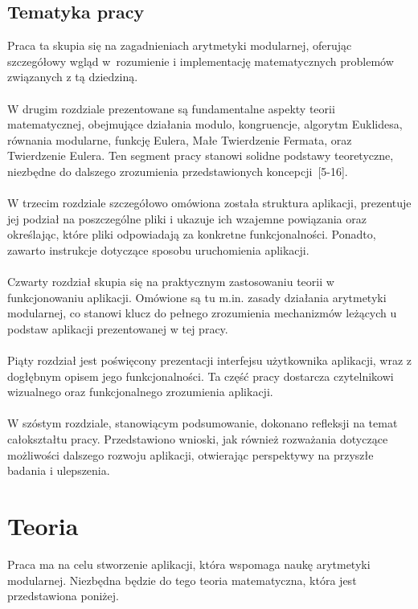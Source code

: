 \documentclass{SGGW-thesis}
\begin{document}
	\section{Tematyka pracy}
	Praca ta skupia się na zagadnieniach arytmetyki modularnej, oferując szczegółowy wgląd w~rozumienie i implementację matematycznych problemów związanych z tą dziedziną.
	\\
	\\
	W drugim rozdziale prezentowane są fundamentalne aspekty teorii matematycznej, obejmujące działania modulo, kongruencje, algorytm Euklidesa, równania modularne, funkcję Eulera, Małe Twierdzenie Fermata, oraz Twierdzenie Eulera. Ten segment pracy stanowi solidne podstawy teoretyczne, niezbędne do dalszego zrozumienia przedstawionych koncepcji~[5-16].
	\\
	\\
	W trzecim rozdziale szczegółowo omówiona została struktura aplikacji, prezentuje jej podział na poszczególne pliki i ukazuje ich wzajemne powiązania oraz określając, które pliki odpowiadają za konkretne funkcjonalności. Ponadto, zawarto instrukcje dotyczące sposobu uruchomienia aplikacji.
	\\
	\\
	Czwarty rozdział skupia się na praktycznym zastosowaniu teorii w funkcjonowaniu aplikacji. Omówione są tu m.in. zasady działania arytmetyki modularnej, co stanowi klucz do pełnego zrozumienia mechanizmów leżących u podstaw aplikacji prezentowanej w tej pracy.
	\\
	\\
	Piąty rozdział jest poświęcony prezentacji interfejsu użytkownika aplikacji, wraz z dogłębnym opisem jego funkcjonalności. Ta część pracy dostarcza czytelnikowi wizualnego oraz funkcjonalnego zrozumienia aplikacji.
	\\
	\\
	W szóstym rozdziale, stanowiącym podsumowanie, dokonano refleksji na temat całokształtu pracy. Przedstawiono wnioski, jak również rozważania dotyczące możliwości dalszego rozwoju aplikacji, otwierając perspektywy na przyszłe badania i ulepszenia.
	\newpage
	
	\chapter{Teoria}
	Praca ma na celu stworzenie aplikacji, która wspomaga naukę arytmetyki modularnej. Niezbędna będzie do tego teoria matematyczna, która jest przedstawiona poniżej.
\end{document}
